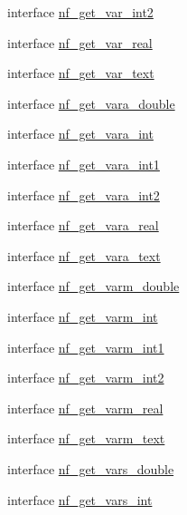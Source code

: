 \begin{DoxyCompactItemize}
\item 
interface \hyperlink{interfacenetcdf__nf__interfaces_1_1nf__get__var__int2}{nf\+\_\+get\+\_\+var\+\_\+int2}
\item 
interface \hyperlink{interfacenetcdf__nf__interfaces_1_1nf__get__var__real}{nf\+\_\+get\+\_\+var\+\_\+real}
\item 
interface \hyperlink{interfacenetcdf__nf__interfaces_1_1nf__get__var__text}{nf\+\_\+get\+\_\+var\+\_\+text}
\item 
interface \hyperlink{interfacenetcdf__nf__interfaces_1_1nf__get__vara__double}{nf\+\_\+get\+\_\+vara\+\_\+double}
\item 
interface \hyperlink{interfacenetcdf__nf__interfaces_1_1nf__get__vara__int}{nf\+\_\+get\+\_\+vara\+\_\+int}
\item 
interface \hyperlink{interfacenetcdf__nf__interfaces_1_1nf__get__vara__int1}{nf\+\_\+get\+\_\+vara\+\_\+int1}
\item 
interface \hyperlink{interfacenetcdf__nf__interfaces_1_1nf__get__vara__int2}{nf\+\_\+get\+\_\+vara\+\_\+int2}
\item 
interface \hyperlink{interfacenetcdf__nf__interfaces_1_1nf__get__vara__real}{nf\+\_\+get\+\_\+vara\+\_\+real}
\item 
interface \hyperlink{interfacenetcdf__nf__interfaces_1_1nf__get__vara__text}{nf\+\_\+get\+\_\+vara\+\_\+text}
\item 
interface \hyperlink{interfacenetcdf__nf__interfaces_1_1nf__get__varm__double}{nf\+\_\+get\+\_\+varm\+\_\+double}
\item 
interface \hyperlink{interfacenetcdf__nf__interfaces_1_1nf__get__varm__int}{nf\+\_\+get\+\_\+varm\+\_\+int}
\item 
interface \hyperlink{interfacenetcdf__nf__interfaces_1_1nf__get__varm__int1}{nf\+\_\+get\+\_\+varm\+\_\+int1}
\item 
interface \hyperlink{interfacenetcdf__nf__interfaces_1_1nf__get__varm__int2}{nf\+\_\+get\+\_\+varm\+\_\+int2}
\item 
interface \hyperlink{interfacenetcdf__nf__interfaces_1_1nf__get__varm__real}{nf\+\_\+get\+\_\+varm\+\_\+real}
\item 
interface \hyperlink{interfacenetcdf__nf__interfaces_1_1nf__get__varm__text}{nf\+\_\+get\+\_\+varm\+\_\+text}
\item 
interface \hyperlink{interfacenetcdf__nf__interfaces_1_1nf__get__vars__double}{nf\+\_\+get\+\_\+vars\+\_\+double}
\item 
interface \hyperlink{interfacenetcdf__nf__interfaces_1_1nf__get__vars__int}{nf\+\_\+get\+\_\+vars\+\_\+int}

\end{DoxyCompactItemize}

